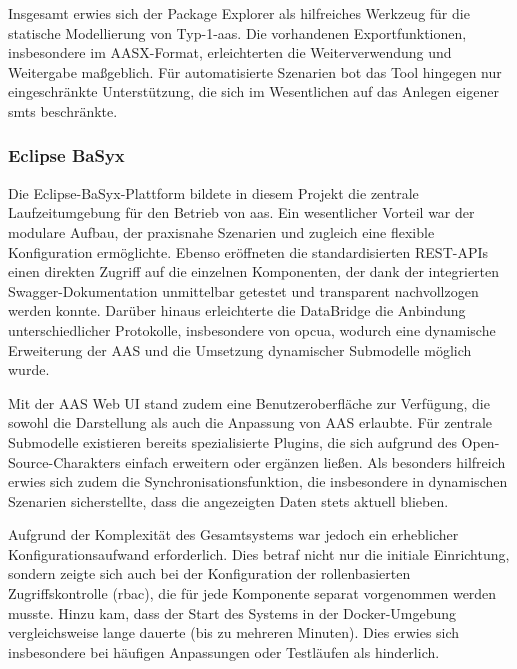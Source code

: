 Insgesamt erwies sich der Package Explorer als hilfreiches Werkzeug für die statische Modellierung von Typ-1-\acs{aas}.
Die vorhandenen Exportfunktionen, insbesondere im AASX-Format, erleichterten die Weiterverwendung und Weitergabe maßgeblich.
Für automatisierte Szenarien bot das Tool hingegen nur eingeschränkte Unterstützung, die sich im Wesentlichen auf das Anlegen eigener \acsp{smt} beschränkte.

\newpage
\subsubsection{Eclipse BaSyx}

Die Eclipse-BaSyx-Plattform bildete in diesem Projekt die zentrale Laufzeitumgebung für den Betrieb von \acs{aas}.
Ein wesentlicher Vorteil war der modulare Aufbau, der praxisnahe Szenarien und zugleich eine flexible Konfiguration ermöglichte.
Ebenso eröffneten die standardisierten REST-APIs einen direkten Zugriff auf die einzelnen Komponenten, der dank der integrierten Swagger-Dokumentation unmittelbar getestet und transparent nachvollzogen werden konnte.
Darüber hinaus erleichterte die DataBridge die Anbindung unterschiedlicher Protokolle, insbesondere von \acs{opcua}, wodurch eine dynamische Erweiterung der AAS und die Umsetzung dynamischer Submodelle möglich wurde.

Mit der AAS Web UI stand zudem eine Benutzeroberfläche zur Verfügung, die sowohl die Darstellung als auch die Anpassung von AAS erlaubte. 
Für zentrale Submodelle existieren bereits spezialisierte Plugins, die sich aufgrund des Open-Source-Charakters einfach erweitern oder ergänzen ließen.
Als besonders hilfreich erwies sich zudem die Synchronisationsfunktion, die insbesondere in dynamischen Szenarien sicherstellte, dass die angezeigten Daten stets aktuell blieben.

Aufgrund der Komplexität des Gesamtsystems war jedoch ein erheblicher Konfigurationsaufwand erforderlich.
Dies betraf nicht nur die initiale Einrichtung, sondern zeigte sich auch bei der Konfiguration der rollenbasierten Zugriffskontrolle (\acs{rbac}), die für jede Komponente separat vorgenommen werden musste.
Hinzu kam, dass der Start des Systems in der Docker-Umgebung vergleichsweise lange dauerte (bis zu mehreren Minuten).
Dies erwies sich insbesondere bei häufigen Anpassungen oder Testläufen als hinderlich.

